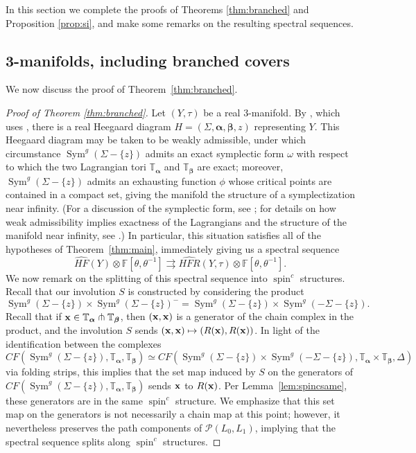 \documentclass[11pt,reqno]{amsart}
\theoremstyle{definition}
\theoremstyle{remark}
\newcommand{\T}{\mathbb{T}}
\DeclareMathOperator{\spin}{{spin}}
\DeclareMathOperator{\Sym}{{Sym}}
\newcommand{\bF}{\mathbb{F}}
\newcommand{\alphas}{\boldsymbol \alpha}
\newcommand{\betas}{\boldsymbol \beta}
\newcommand{\CF}{\mathit{CF}}
\newcommand{\HF}{\mathit{HF}}
\newcommand{\HFR}{\mathit{HFR}}
\newcommand{\HFRhat}{\widehat{\HFR}}
\newcommand\HFhat{\widehat{\HF}}
\numberwithin{equation}{section}
\begin{document}
In this section we complete the proofs of Theorems \ref{thm:branched} and Proposition \ref{prop:si}, and make some remarks on the resulting spectral sequences.

\subsection{3-manifolds, including branched covers}

We now discuss the proof of Theorem~\ref{thm:branched}. 

\begin{proof}[Proof of Theorem \ref{thm:branched}] Let $(Y, \tau)$ be a real 3-manifold. By  \cite[Proposition 3.2]{GM:real}, which uses \cite[Proposition 2.4]{Nagase}, there is a real Heegaard diagram $H= (\Sigma, \alphas, \betas, z)$ representing $Y$. This Heegaard diagram may be taken to be weakly admissible, under which circumstance $\Sym^g(\Sigma - \{z\})$ admits an exact symplectic form $\omega$ with respect to which the two Lagrangian tori $\T_{\alphas}$ and $\T_{\betas}$ are exact; moreover, $\Sym^g(\Sigma - \{z\})$ admits an exhausting function $\phi$ whose critical points are contained in a compact set, giving the manifold the structure of a symplectization near infinity. (For a discussion of the symplectic form, see \cite{Perutz:Hamiltonian}; for details on how weak admissibility implies exactness of the Lagrangians and the structure of the manifold near infinity, see \cite[Proof of Proposition 4.2]{HLL:branched}.) In particular, this situation satisfies all of the hypotheses of Theorem~\ref{thm:main}, immediately giving us a spectral sequence
%
\begin{equation} \label{eqn:branchednospinc} \HFhat(Y) \otimes \bF[\theta, \theta^{-1}] \rightrightarrows \HFRhat(Y,\tau) \otimes \bF[\theta, \theta^{-1}].\end{equation}
%
We now remark on the splitting of this spectral sequence into $\spin^c$ structures.  Recall that our involution $S$ is constructed by considering the product 
%
\[\Sym^g(\Sigma-\{z\}) \times \Sym^g(\Sigma-\{z\})^- = \Sym^g(\Sigma - \{z\}) \times \Sym^g(-\Sigma -\{z\}).\]
%
Recall that if ${\bf x} \in \T_{\alphas} \pitchfork \T_{\betas}$, then $({\bf x},{\bf x})$ is a generator of the chain complex in the product, and the involution $S$ sends $({\bf x}, {\bf x}) \mapsto (R({\bf x}), R({\bf x}))$. In light of the identification between the complexes 
\[\CF(\Sym^g(\Sigma-\{z\}), \T_{\alphas}, \T_{\betas}) \simeq \CF(\Sym^g(\Sigma - \{z\}) \times \Sym^g(-\Sigma -\{z\}), \T_{\alphas} \times \T_{\betas}, \Delta)\] 
via folding strips, this implies that the set map induced by $S$ on the generators of $\CF(\Sym^g(\Sigma-\{z\}), \T_{\alphas}, \T_{\betas})$ sends ${\bf x}$ to $R({\bf x})$. Per Lemma~\ref{lem:spincsame}, these generators are in the same $\spin^c$ structure. We emphasize that this set map on the generators is not necessarily a chain map at this point; however, it nevertheless preserves the path components of $\mathcal P(L_0, L_1)$, implying that the spectral sequence splits along $\spin^c$ structures.
	


\end{proof}
\end{document}

